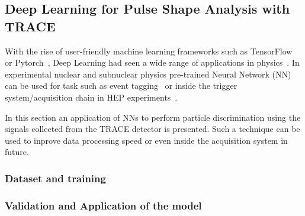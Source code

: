 \subsection{Deep Learning for Pulse Shape Analysis with TRACE}
With the rise of user-friendly machine learning frameworks such as TensorFlow~\cite{tensorflow} or Pytorch~\cite{pytorch}, Deep Learning had seen a wide range of applications in physics~\cite{ml4phys}. In experimental nuclear and subnuclear physics pre-trained Neural Network (NN) can be used for task such as event tagging~\cite{baldi} or inside the trigger system/acquisition chain in HEP experiments~\cite{williams}. 


In this section an application of NNs to perform particle discrimination using the signals collected from the TRACE detector is presented. Such a technique can be used to inprove data processing speed or even inside the acquisition system in future.

\subsubsection{Dataset and training}

\subsubsection{Validation and Application of the model	}